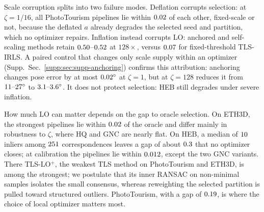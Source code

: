 \documentclass[runningheads]{llncs}
\newcommand{\suppsec}[1]{Supp.\ Sec.~\ref{supp:#1}}
\newcommand{\tlsirls}{TLS-IRLS}   %
\begin{document}
Scale corruption splits into two failure modes. Deflation corrupts
selection: at $\zeta=1/16$, all PhotoTourism pipelines lie within $0.02$ of
each other, fixed-scale or not, because the deflated $a$ already degrades
the selected seed and partition, which no optimizer repairs. Inflation
instead corrupts LO: anchored and self-scaling methods retain
$0.50$--$0.52$ at $128\times$, versus $0.07$ for fixed-threshold
\tlsirls{}. A paired control that changes only scale supply within an
optimizer (\suppsec{sec:supp-anchoring}) confirms this attribution:
anchoring changes pose error by at most $0.02^\circ$ at $\zeta=1$,
but at $\zeta=128$ reduces it from $11\text{--}27^\circ$ to
$3.1\text{--}3.6^\circ$. It does not protect selection: HEB still
degrades under severe inflation.

How much LO can matter depends on the gap to oracle selection. On ETH3D,
the strongest pipelines lie within $0.02$ of the oracle and differ mainly in
robustness to $\zeta$, where HQ and GNC are nearly flat. On HEB, a median of
$10$ inliers among $251$ correspondences leaves a gap of about
$0.3$ that no optimizer closes; at calibration the pipelines lie within
$0.012$, except the two GNC variants. There TLS-LO$^+$, the weakest TLS method on
PhotoTourism and ETH3D, is among the strongest; we postulate that its inner
RANSAC on non-minimal samples isolates the small consensus, whereas
reweighting the selected partition is pulled toward structured outliers.
PhotoTourism, with a gap of $0.19$, is where the choice of local optimizer
matters most.
\end{document}
